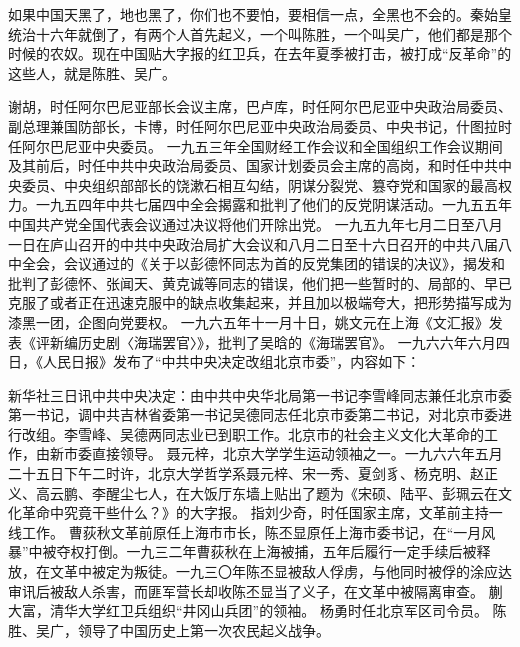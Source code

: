 如果中国天黑了，地也黑了，你们也不要怕，要相信一点，全黑也不会的。秦始皇统治十六年就倒了，有两个人首先起义，一个叫陈胜，一个叫吴广，他们都是那个时候的农奴。现在中国贴大字报的红卫兵，在去年夏季被打击，被打成“反革命”的这些人，就是陈胜、吴广。

\begin{maonote}
谢胡，时任阿尔巴尼亚部长会议主席，巴卢库，时任阿尔巴尼亚中央政治局委员、副总理兼国防部长，卡博，时任阿尔巴尼亚中央政治局委员、中央书记，什图拉时任阿尔巴尼亚中央委员。
一九五三年全国财经工作会议和全国组织工作会议期间及其前后，时任中共中央政治局委员、国家计划委员会主席的高岗，和时任中共中央委员、中央组织部部长的饶漱石相互勾结，阴谋分裂党、篡夺党和国家的最高权力。一九五四年中共七届四中全会揭露和批判了他们的反党阴谋活动。一九五五年中国共产党全国代表会议通过决议将他们开除出党。
一九五九年七月二日至八月一日在庐山召开的中共中央政治局扩大会议和八月二日至十六日召开的中共八届八中全会，会议通过的《关于以彭德怀同志为首的反党集团的错误的决议》，揭发和批判了彭德怀、张闻天、黄克诚等同志的错误，他们把一些暂时的、局部的、早已克服了或者正在迅速克服中的缺点收集起来，并且加以极端夸大，把形势描写成为漆黑一团，企图向党要权。
一九六五年十一月十日，姚文元在上海《文汇报》发表《评新编历史剧〈海瑞罢官〉》，批判了吴晗的《海瑞罢官》。
一九六六年六月四日，《人民日报》发布了“中共中央决定改组北京市委”，内容如下：

新华社三日讯中共中央决定：由中共中央华北局第一书记李雪峰同志兼任北京市委第一书记，调中共吉林省委第一书记吴德同志任北京市委第二书记，对北京市委进行改组。李雪峰、吴德两同志业已到职工作。北京市的社会主义文化大革命的工作，由新市委直接领导。
聂元梓，北京大学学生运动领袖之一。一九六六年五月二十五日下午二时许，北京大学哲学系聂元梓、宋一秀、夏剑豸、杨克明、赵正义、高云鹏、李醒尘七人，在大饭厅东墙上贴出了题为《宋硕、陆平、彭珮云在文化革命中究竟干些什么？》的大字报。
指刘少奇，时任国家主席，文革前主持一线工作。
曹荻秋文革前原任上海市市长，陈丕显原任上海市委书记，在“一月风暴”中被夺权打倒。一九三二年曹荻秋在上海被捕，五年后履行一定手续后被释放，在文革中被定为叛徒。一九三〇年陈丕显被敌人俘虏，与他同时被俘的涂应达审讯后被敌人杀害，而匪军营长却收陈丕显当了义子，在文革中被隔离审查。
蒯大富，清华大学红卫兵组织“井冈山兵团”的领袖。
杨勇时任北京军区司令员。
陈胜、吴广，领导了中国历史上第一次农民起义战争。
\end{maonote}
